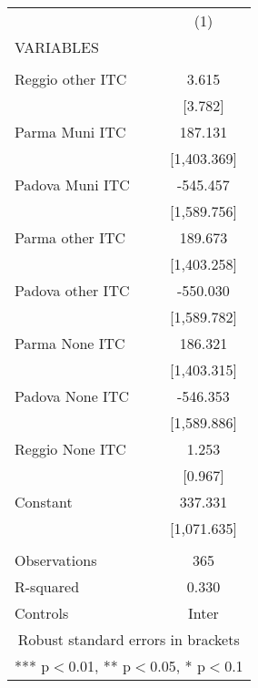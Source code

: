 \begin{tabular}{lc} \hline
 & (1) \\
VARIABLES &  \\ \hline
 &  \\
Reggio other ITC & 3.615 \\
 & [3.782] \\
Parma Muni ITC & 187.131 \\
 & [1,403.369] \\
Padova Muni ITC & -545.457 \\
 & [1,589.756] \\
Parma other ITC & 189.673 \\
 & [1,403.258] \\
Padova other ITC & -550.030 \\
 & [1,589.782] \\
Parma None ITC & 186.321 \\
 & [1,403.315] \\
Padova None ITC & -546.353 \\
 & [1,589.886] \\
Reggio None ITC & 1.253 \\
 & [0.967] \\
Constant & 337.331 \\
 & [1,071.635] \\
 &  \\
Observations & 365 \\
R-squared & 0.330 \\
 Controls & Inter \\ \hline
\multicolumn{2}{c}{ Robust standard errors in brackets} \\
\multicolumn{2}{c}{ *** p$<$0.01, ** p$<$0.05, * p$<$0.1} \\
\end{tabular}
